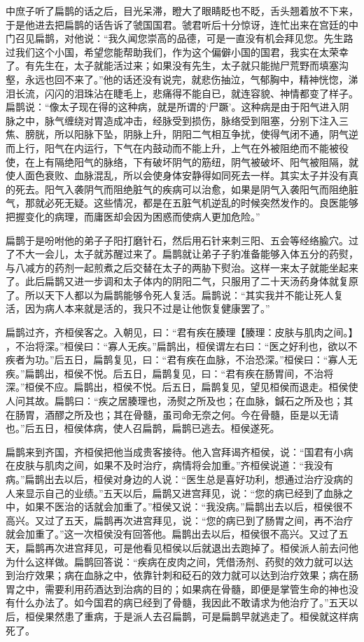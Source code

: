 \documentclass[12pt,UTF8]{ctexbook}
\begin{document}
中庶子听了扁鹊的话之后，目光呆滞，瞪大了眼睛眨也不眨，舌头翘着放不下来，于是他进去把扁鹊的话告诉了虢国国君。虢君听后十分惊讶，连忙出来在宫廷的中门召见扁鹊，对他说：“我久闻您崇高的品德，可是一直没有机会拜见您。先生路过我们这个小国，希望您能帮助我们，作为这个偏僻小国的国君，我实在太荣幸了。有先生在，太子就能活过来；如果没有先生，太子就只能抛尸荒野而填塞沟壑，永远也回不来了。”他的话还没有说完，就悲伤抽泣，气郁胸中，精神恍惚，涕泪长流，闪闪的泪珠沾在睫毛上，悲痛得不能自已，就连容貌、神情都变了样子。扁鹊说：“像太子现在得的这种病，就是所谓的‘尸蹶’。这种病是由于阳气进入阴脉之中，脉气缠绕对胃造成冲击，经脉受到损伤，脉络受到阻塞，分别下注入三焦、膀胱，所以阳脉下坠，阴脉上升，阴阳二气相互争扰，使得气闭不通，阴气逆而上行，阳气在内运行，下气在内鼓动而不能上升，上气在外被阻绝而不能被役使，在上有隔绝阳气的脉络，下有破坏阴气的筋纽，阴气被破坏、阳气被阻隔，就使人面色衰败、血脉混乱，所以会使身体安静得如同死去一样。其实太子并没有真的死去。阳气入袭阴气而阻绝脏气的疾病可以治愈，如果是阴气入袭阳气而阻绝脏气，那就必死无疑。这些情况，都是在五脏气机逆乱的时候突然发作的。良医能够把握变化的病理，而庸医却会因为困惑而使病人更加危险。”

扁鹊于是吩咐他的弟子子阳打磨针石，然后用石针来刺三阳、五会等经络腧穴。过了不大一会儿，太子就苏醒过来了。扁鹊就让弟子子豹准备能够入体五分的药熨，与八减方的药剂一起煎煮之后交替在太子的两胁下熨治。这样一来太子就能坐起来了。此后扁鹊又进一步调和太子体内的阴阳二气，只服用了二十天汤药身体就复原了。所以天下人都以为扁鹊能够令死人复活。扁鹊说：“其实我并不能让死人复活，因为病人本来就是活的，我只不过是让他恢复健康罢了。”

扁鹊过齐，齐桓侯客之。入朝见，曰：“君有疾在腠理【腠理：皮肤与肌肉之间。】 ，不治将深。”桓侯曰：“寡人无疾。”扁鹊出，桓侯谓左右曰：“医之好利也，欲以不疾者为功。”后五日，扁鹊复见，曰：“君有疾在血脉，不治恐深。”桓侯曰：“寡人无疾。”扁鹊出，桓侯不悦。后五日，扁鹊复见，曰：“君有疾在肠胃间，不治将深。”桓侯不应。扁鹊出，桓侯不悦。后五日，扁鹊复见，望见桓侯而退走。桓侯使人问其故。扁鹊曰：“疾之居腠理也，汤熨之所及也；在血脉，鍼石之所及也；其在肠胃，酒醪之所及也；其在骨髓，虽司命无奈之何。今在骨髓，臣是以无请也。”后五日，桓侯体病，使人召扁鹊，扁鹊已逃去。桓侯遂死。

扁鹊来到齐国，齐桓侯把他当成贵客接待。他入宫拜谒齐桓侯，说：“国君有小病在皮肤与肌肉之间，如果不及时治疗，病情将会加重。”齐桓侯说道：“我没有病。”扁鹊出去以后，桓侯对身边的人说：“医生总是喜好功利，想通过治疗没病的人来显示自己的业绩。”五天以后，扁鹊又进宫拜见，说：“您的病已经到了血脉之中，如果不医治的话就会加重了。”桓侯又说：“我没病。”扁鹊出去以后，桓侯很不高兴。又过了五天，扁鹊再次进宫拜见，说：“您的病已到了肠胃之间，再不治疗就会加重了。”这一次桓侯没有回答他。扁鹊出去以后，桓侯很不高兴。又过了五天，扁鹊再次进宫拜见，可是他看见桓侯以后就退出去跑掉了。桓侯派人前去问他为什么这样做。扁鹊回答说：“疾病在皮肉之间，凭借汤剂、药熨的效力就可以达到治疗效果；病在血脉之中，依靠针刺和砭石的效力就可以达到治疗效果；病在肠胃之中，需要利用药酒达到治病的目的；如果病在骨髓，即便是掌管生命的神也没有什么办法了。如今国君的病已经到了骨髓，我因此不敢请求为他治疗了。”五天以后，桓侯果然患了重病，于是派人去召扁鹊，可是扁鹊早就逃走了。桓侯就这样病死了。
\end{document}
